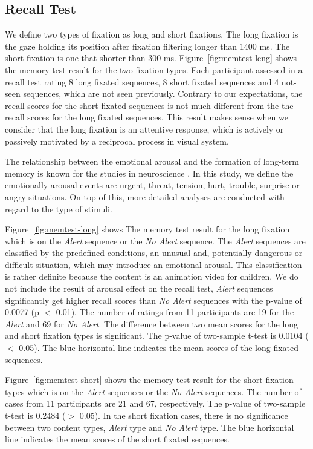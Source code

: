 \documentclass[10pt,letterpaper]{article}
\begin{document}
\subsection{Recall Test}

We define two types of fixation as long and short fixations. The long fixation is the gaze holding its position after fixation filtering longer than 1400 ms. The short fixation is one that shorter than 300 ms. Figure~\ref{fig:memtest-leng} shows the memory test result for the two fixation types. Each participant assessed in a recall test rating 8 long fixated sequences, 8 short fixated sequences and 4 not-seen sequences, which are not seen previously. Contrary to our expectations, the recall scores for the short fixated sequences is not much different from the the recall scores for the long fixated sequences. This result makes sense when we consider that the long fixation is an attentive response, which is actively or passively motivated by a reciprocal process in visual system.

The relationship between the emotional arousal and the formation of long-term memory is known for the studies in neuroscience \cite{Cahill1996amyg,Cahill1998baso}. In this study, we define the emotionally arousal events are urgent, threat, tension, hurt, trouble, surprise or angry situations. On top of this, more detailed analyses are conducted with regard to the type of stimuli.

Figure~\ref{fig:memtest-long} shows The memory test result for the long fixation which is on the \textit{Alert} sequence or the \textit{No Alert} sequence. The \textit{Alert} sequences are classified by the predefined conditions, an unusual and, potentially dangerous or difficult situation, which may introduce an emotional arousal. This classification is rather definite because the content is an animation video for children. We do not include the result of arousal effect on the recall test, \textit{Alert} sequences significantly get higher recall scores than \textit{No Alert} sequences with the p-value of 0.0077 (p $<$ 0.01). The number of ratings from 11 participants are 19 for the \textit{Alert} and 69 for \textit{No Alert}. The difference between two mean scores for the long and short fixation types is significant. The p-value of two-sample t-test is 0.0104 ($<$ 0.05). The blue horizontal line indicates the mean scores of the long fixated sequences.

Figure~\ref{fig:memtest-short} shows the memory test result for the short fixation types which is on the \textit{Alert} sequences or the \textit{No Alert} sequences. The number of cases from 11 participants are 21 and 67, respectively. The p-value of two-sample t-test is 0.2484 ($>$ 0.05). In the short fixation cases, there is no significance between two content types, \textit{Alert} type and \textit{No Alert} type. The blue horizontal line indicates the mean scores of the short fixated sequences.
\end{document}
